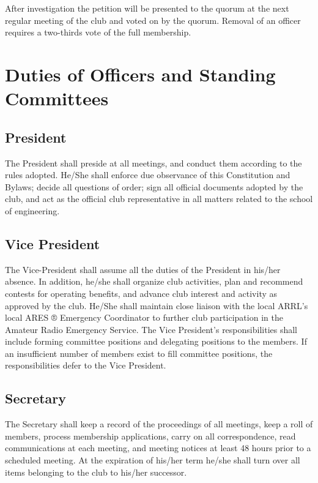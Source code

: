 \documentclass{report}
\begin{document}
\noindent After investigation the petition will be presented to the quorum at the next regular meeting of the club and voted on by the quorum. Removal of an officer requires a two-thirds vote of the full membership.

\chapter{Duties of Officers and Standing Committees}
\section{President}

The President shall preside at all meetings, and conduct them according to the rules adopted. He/She shall enforce due observance of this Constitution and Bylaws; decide all questions of order; sign all official documents adopted by the club, and act as the official club representative in all matters related to the school of engineering. 

\section{Vice President}

The Vice-President shall assume all the duties of the President in his/her absence. In addition, he/she shall organize club activities, plan and recommend contests for operating benefits, and advance club interest and activity as approved by the club. He/She shall maintain close liaison with the local ARRL's local ARES ® Emergency Coordinator to further club participation in the Amateur Radio Emergency Service. The Vice President's responsibilities shall include forming committee positions and delegating positions to the members. If an insufficient number of members exist to fill committee positions, the responsibilities defer to the Vice President. 

\section{Secretary}

The Secretary shall keep a record of the proceedings of all meetings, keep a roll of members,  process membership applications, carry on all correspondence, read communications at each meeting, and meeting notices at least 48 hours prior to a scheduled meeting. At the expiration of his/her term he/she shall turn over all items belonging to the club to his/her successor.
\end{document}
